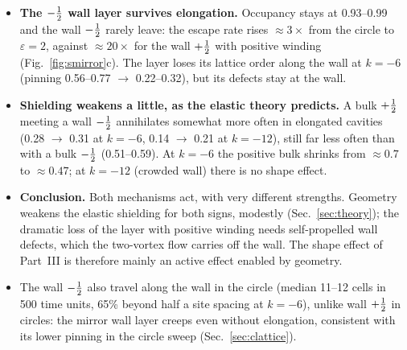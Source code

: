 \begin{itemize}
  \item \textbf{The $-\tfrac12$ wall layer survives elongation.} Occupancy stays at 0.93--0.99 and the wall $-\tfrac12$ rarely leave: the escape rate rises
        $\approx3\times$ from the circle to $\varepsilon=2$, against $\approx20\times$ for the wall $+\tfrac12$ with positive winding (Fig.~\ref{fig:smirror}c).
        The layer loses its lattice order along the wall at $k=-6$ (pinning 0.56--0.77 $\to$ 0.22--0.32), but its defects stay at the wall.
  \item \textbf{Shielding weakens a little, as the elastic theory predicts.} A bulk $+\tfrac12$ meeting a wall $-\tfrac12$ annihilates somewhat more often in
        elongated cavities (0.28 $\to$ 0.31 at $k=-6$, 0.14 $\to$ 0.21 at $k=-12$), still far less often than with a bulk $-\tfrac12$ (0.51--0.59). At $k=-6$
        the positive bulk shrinks from $\approx0.7$ to $\approx0.47$; at $k=-12$ (crowded wall) there is no shape effect.
  \item \textbf{Conclusion.} Both mechanisms act, with very different strengths. Geometry weakens the elastic shielding for both signs, modestly
        (Sec.~\ref{sec:theory}); the dramatic loss of the layer with positive winding needs self-propelled wall defects, which the two-vortex flow carries
        off the wall. The shape effect of Part~III is therefore mainly an active effect enabled by geometry.
  \item The wall $-\tfrac12$ also travel along the wall in the circle (median 11--12 cells in 500 time units, 65\% beyond half a site spacing at $k=-6$),
        unlike wall $+\tfrac12$ in circles: the mirror wall layer creeps even without elongation, consistent with its lower pinning in the circle sweep
        (Sec.~\ref{sec:clattice}).
\end{itemize}
